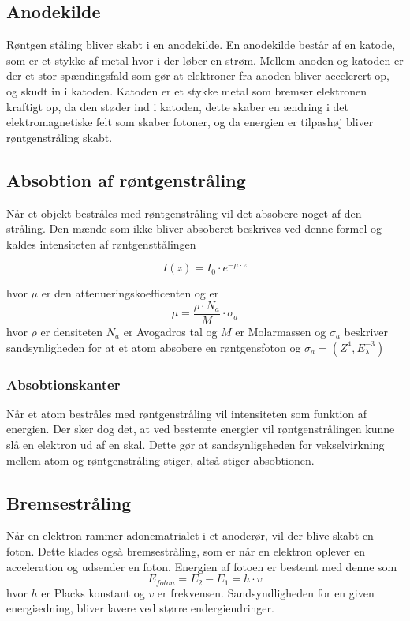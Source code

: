 \documentclass[a4paper,twoside]{article}
\begin{document}
\subsection{Anodekilde}
Røntgen ståling bliver skabt i en anodekilde. En anodekilde består af en katode, som er et stykke af metal hvor i der løber en strøm. Mellem anoden og katoden er der et stor spændingsfald som gør at elektroner fra anoden bliver accelerert op, og skudt in i katoden. Katoden er et stykke metal som bremser elektronen kraftigt op, da den støder ind i katoden, dette skaber en ændring i det elektromagnetiske felt som skaber fotoner, og da energien er tilpashøj bliver røntgenstråling skabt.
\subsection{Absobtion af røntgenstråling}
Når et objekt bestråles med røntgenstråling vil det absobere noget af den stråling. Den mænde som ikke bliver absoberet beskrives ved denne formel og kaldes intensiteten af røntgensttålingen  

\begin{equation}
    I(z)=I_0\cdot e^{-\mu\cdot z}
\end{equation}

hvor $\mu$ er den attenueringskoefficenten og er 
\begin{equation}
    \mu=\frac{\rho\cdot N_a}{M}\cdot\sigma _a 
\end{equation}
hvor $\rho$ er densiteten $N_a$ er Avogadros tal og $M$ er Molarmassen og $\sigma _a$ beskriver sandsynligheden for at et atom absobere en røntgensfoton og $\sigma _a =(Z^4,E_\lambda^{-3})$

\subsubsection{Absobtionskanter}
Når et atom bestråles med røntgenstråling vil intensiteten som funktion af energien. Der sker dog det, at ved bestemte energier vil røntgenstrålingen kunne slå en elektron ud af en skal. Dette gør at sandsynligeheden for vekselvirkning mellem atom og røntgenstråling stiger, altså stiger absobtionen. 

\subsection{Bremsestråling}
Når en elektron rammer adonematrialet i et anoderør, vil der blive skabt en foton. Dette klades også bremsestråling, som er når en elektron oplever en acceleration og udsender en foton. Energien af fotoen er bestemt med denne som
\begin{equation}
    E_{foton}=E_2-E_1=h\cdot v
    \end{equation}
hvor $h$ er Placks konstant og $v$ er frekvensen. Sandsyndligheden for en given energiædning, bliver lavere ved større endergiendringer.
\end{document}
